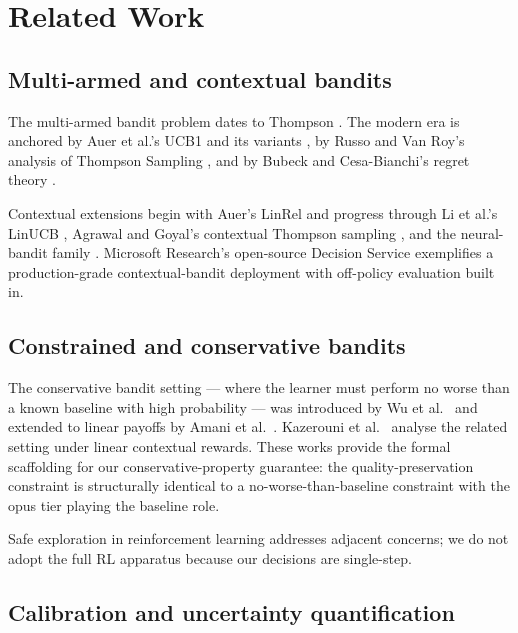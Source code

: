 \section{Related Work}
\label{sec:related}

\subsection{Multi-armed and contextual bandits}

The multi-armed bandit problem dates to Thompson \cite{thompson1933likelihood}.
The modern era is anchored by Auer et al.'s UCB1 and its variants
\cite{auer2002finite,audibert2009exploration}, by Russo and Van Roy's
analysis of Thompson Sampling
\cite{russo2014learning,russo2018tutorial,agrawal2012analysis}, and by Bubeck
and Cesa-Bianchi's regret theory \cite{bubeck2012regret}.

Contextual extensions begin with Auer's LinRel and progress through
Li et al.'s LinUCB \cite{li2010contextual}, Agrawal and Goyal's contextual
Thompson sampling \cite{agrawal2013thompson}, and the neural-bandit family
\cite{zhou2020neural,zhang2020neural}. Microsoft Research's open-source
Decision Service \cite{agarwal2016making} exemplifies a production-grade
contextual-bandit deployment with off-policy evaluation built in.

\subsection{Constrained and conservative bandits}

The conservative bandit setting --- where the learner must perform no
worse than a known baseline with high probability --- was introduced by Wu
et al.\ \cite{wu2016conservative} and extended to linear payoffs by Amani
et al.\ \cite{amani2019linear}. Kazerouni et al.\ \cite{kazerouni2017conservative}
analyse the related setting under linear contextual rewards. These works
provide the formal scaffolding for our conservative-property guarantee:
the quality-preservation constraint is structurally identical to a
no-worse-than-baseline constraint with the opus tier playing the baseline
role.

Safe exploration in reinforcement learning
\cite{garcia2015comprehensive,achiam2017constrained} addresses adjacent
concerns; we do not adopt the full RL apparatus because our decisions are
single-step.

\subsection{Calibration and uncertainty quantification}

